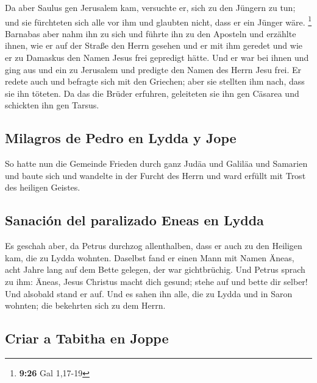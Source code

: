  Da aber Saulus gen Jerusalem kam, versuchte er, sich zu
den Jüngern zu tun; und sie fürchteten sich alle vor ihm und glaubten
nicht, dass er ein Jünger wäre. \footnote{\textbf{9:26} Gal 1,17-19}
 Barnabas aber nahm ihn zu sich und führte ihn zu den
Aposteln und erzählte ihnen, wie er auf der Straße den Herrn gesehen und
er mit ihm geredet und wie er zu Damaskus den Namen Jesus frei gepredigt
hätte.  Und er war bei ihnen und ging aus und ein zu
Jerusalem und predigte den Namen des Herrn Jesu frei.  Er
redete auch und befragte sich mit den Griechen; aber sie stellten ihm
nach, dass sie ihn töteten.  Da das die Brüder erfuhren,
geleiteten sie ihn gen Cäsarea und schickten ihn gen Tarsus.

\hypertarget{milagros-de-pedro-en-lydda-y-jope}{%
\subsection{Milagros de Pedro en Lydda y
Jope}\label{milagros-de-pedro-en-lydda-y-jope}}

 So hatte nun die Gemeinde Frieden durch ganz Judäa und
Galiläa und Samarien und baute sich und wandelte in der Furcht des Herrn
und ward erfüllt mit Trost des heiligen Geistes.

\hypertarget{sanaciuxf3n-del-paralizado-eneas-en-lydda}{%
\subsection{Sanación del paralizado Eneas en
Lydda}\label{sanaciuxf3n-del-paralizado-eneas-en-lydda}}

 Es geschah aber, da Petrus durchzog allenthalben, dass
er auch zu den Heiligen kam, die zu Lydda wohnten. 
Daselbst fand er einen Mann mit Namen Äneas, acht Jahre lang auf dem
Bette gelegen, der war gichtbrüchig.  Und Petrus sprach
zu ihm: Äneas, Jesus Christus macht dich gesund; stehe auf und bette dir
selber! Und alsobald stand er auf.  Und es sahen ihn
alle, die zu Lydda und in Saron wohnten; die bekehrten sich zu dem
Herrn.

\hypertarget{criar-a-tabitha-en-joppe}{%
\subsection{Criar a Tabitha en Joppe}\label{criar-a-tabitha-en-joppe}}

